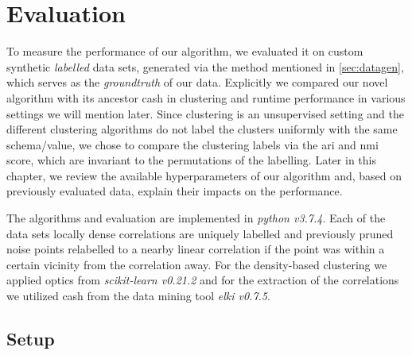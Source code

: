 \chapter{Evaluation}\label{ch:evaluation}
To measure the performance of our algorithm, we evaluated  it on custom synthetic \textit{labelled} data sets, generated via the method mentioned in \autoref{sec:datagen}, which serves as the \textit{groundtruth} of our data. Explicitly we compared our novel algorithm with its ancestor \gls{cash} in clustering and runtime performance in various settings we will mention later. Since clustering is an unsupervised setting and the different clustering algorithms do not label the clusters uniformly with the same schema/value, we chose to compare the clustering labels via the \gls{ari}\cite{hubert1985comparingari} and \gls{nmi}\cite{strehl2002clusternmi} score, which are invariant to the permutations of the labelling. Later in this chapter, we review the available hyperparameters of our algorithm and, based on previously evaluated data, explain their impacts on the performance.

The algorithms and evaluation are implemented in \textit{python v3.7.4}. Each of the data sets locally dense correlations are uniquely labelled and previously pruned noise points relabelled to a nearby linear correlation if the point was within a certain vicinity from the correlation away. For the density-based clustering we applied \gls{optics} from \textit{scikit-learn v0.21.2}\cite{pedregosa2011scikit} and for the extraction of the correlations we utilized \gls{cash} from the data mining tool \textit{\gls{elki} v0.7.5}\cite{achtert2008elki}. 



\section{Setup}\label{sec:setup}


